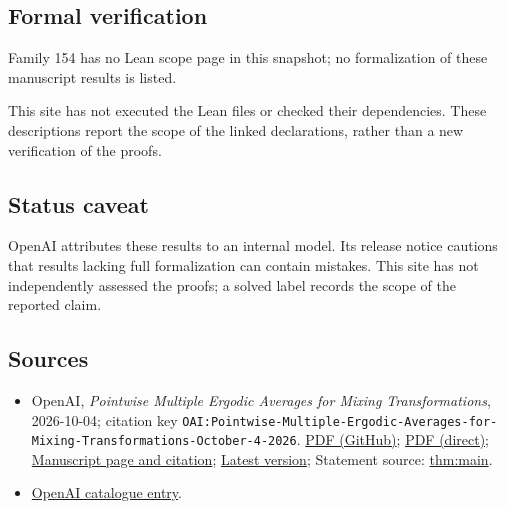 \documentclass[11pt]{article}
\begin{document}
\subsection{Formal verification}
Family 154 has no Lean scope page in this snapshot; no formalization of these manuscript results is listed.

This site has not executed the Lean files or checked their dependencies. These descriptions report the scope of the linked declarations, rather than a new verification of the proofs.

\subsection{Status caveat}
OpenAI attributes these results to an internal model. Its release notice cautions that results lacking full formalization can contain mistakes. This site has not independently assessed the proofs; a solved label records the scope of the reported claim.

\subsection{Sources}
\begin{itemize}
\item OpenAI, \emph{Pointwise Multiple Ergodic Averages for Mixing Transformations}, 2026-10-04; citation key \texttt{OAI:Pointwise-Multiple-Ergodic-Averages-for-Mixing-Transformations-October-4-2026}. \href{https://github.com/openai/math/blob/adc7f1241b42e322a6451854ab7e4b4c146bf78a/preprints/Pointwise-Multiple-Ergodic-Averages-for-Mixing-Transformations-October-4-2026/multiple-ergodic-averages.pdf}{PDF (GitHub)}; \href{https://github.com/openai/math/raw/adc7f1241b42e322a6451854ab7e4b4c146bf78a/preprints/Pointwise-Multiple-Ergodic-Averages-for-Mixing-Transformations-October-4-2026/multiple-ergodic-averages.pdf}{PDF (direct)}; \href{https://github.com/openai/math/blob/adc7f1241b42e322a6451854ab7e4b4c146bf78a/preprints/Pointwise-Multiple-Ergodic-Averages-for-Mixing-Transformations-October-4-2026/README.md}{Manuscript page and citation}; \href{https://github.com/openai/math/blob/main/preprints/Pointwise-Multiple-Ergodic-Averages-for-Mixing-Transformations-October-4-2026/multiple-ergodic-averages.pdf}{Latest version}; Statement source: \href{https://github.com/openai/math/blob/adc7f1241b42e322a6451854ab7e4b4c146bf78a/preprints/Pointwise-Multiple-Ergodic-Averages-for-Mixing-Transformations-October-4-2026/build/sections/introduction.tex\#L20}{thm:main}.
\item \href{https://github.com/openai/math/blob/adc7f1241b42e322a6451854ab7e4b4c146bf78a/CONTENTS.md}{OpenAI catalogue entry}.
\end{itemize}
\end{document}
